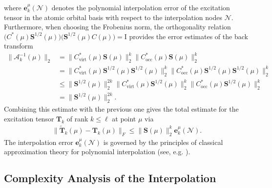 \documentclass[reqno]{amsart}
\begin{document}
where $\mathbf{e}^\mu_k(\mathcal{N})$ denotes the polynomial interpolation error of the excitation tensor in the atomic orbital basis with respect to the interpolation nodes $\mathcal{N}$. Furthermore, when choosing the Frobenius norm, the orthogonality relation $\big(C^*(\mu)\mathbf{S}^{1/2}(\mu)\big)\big(\mathbf{S}^{1/2}(\mu)C(\mu)\big)=\mathrm{I}$ provides the error estimates of the back transform
\begin{align*}
    \|\mathcal{A}_k^{-1}(\mu)\|_2&=\|C^*_{\text{virt}}(\mu)\mathbf{S}(\mu)\|_2^k\|C^*_{\text{occ}}(\mu)\mathbf{S}(\mu)\|_2^k\\
    &=\|C^*_{\text{virt}}(\mu)\mathbf{S}^{1/2}(\mu)\mathbf{S}^{1/2}(\mu)\|_2^k\|C^*_{\text{occ}}(\mu)\mathbf{S}^{1/2}(\mu)\mathbf{S}^{1/2}(\mu)\|_2^k\\
    &\le \|\mathbf{S}^{1/2}(\mu)\|_2^{2k}\|C^*_{\text{virt}}(\mu)\mathbf{S}^{1/2}(\mu)\|_2^k\|C^*_{\text{occ}}(\mu)\mathbf{S}^{1/2}(\mu)\|_2^k\\
    &= \|\mathbf{S}^{1/2}(\mu)\|_2^{2k}.
\end{align*}
Combining this estimate with the previous one gives the total estimate for the excitation tensor $\mathbf{T}_k$ of rank $k\le \ell$ at point $\mu$ via
\begin{align}
    \|\widetilde{\mathbf{T}}_k(\mu)-\mathbf{T}_k(\mu)\|_F\le \|\mathbf{S}(\mu)\|_2^{k}\mathbf{e}^{\mu}_k(\mathcal{N}).
\end{align}
The interpolation error $\mathbf{e}^\mu_k(\mathcal{N})$ is governed by the principles of classical approximation theory for polynomial interpolation (see, e.g. \cite{agarwal1993error}).




\subsection{Complexity Analysis of the Interpolation}
\end{document}
